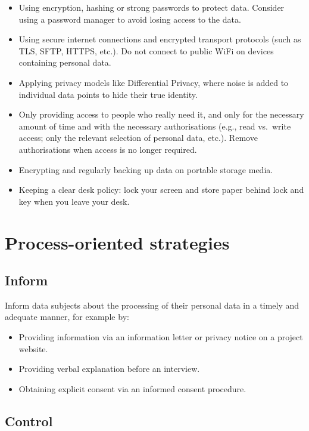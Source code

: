 \documentclass[
]{book}
\providecommand{\tightlist}{%
  \setlength{\itemsep}{0pt}\setlength{\parskip}{0pt}}
\begin{document}
\begin{itemize}
\tightlist
\item
  Using encryption, hashing or
  strong passwords
  to protect data. Consider using a password manager to avoid losing access to the
  data.
\item
  Using secure internet connections and encrypted transport protocols (such as
  TLS, SFTP, HTTPS, etc.). Do not connect to public WiFi on devices containing
  personal data.
\item
  Applying privacy models like Differential Privacy,
  where noise is added to individual data points to hide their true identity.
\item
  Only providing access to people who really need it, and only for the necessary
  amount of time and with the necessary authorisations (e.g., read vs.~write
  access; only the relevant selection of personal data, etc.). Remove
  authorisations when access is no longer required.
\item
  Encrypting and regularly backing up data on portable storage media.
\item
  Keeping a clear desk policy: lock your screen and store paper behind lock and
  key when you leave your desk.
\end{itemize}

\hypertarget{process-oriented-strategies}{%
\section{Process-oriented strategies}\label{process-oriented-strategies}}

\hypertarget{inform}{%
\subsection{Inform}\label{inform}}

Inform data subjects about the processing of their personal data in a timely
and adequate manner, for example by:

\begin{itemize}
\tightlist
\item
  Providing information via an
  information letter or privacy notice on a project
  website.
\item
  Providing verbal explanation before an interview.
\item
  Obtaining explicit consent via an informed consent procedure.
\end{itemize}

\hypertarget{control}{%
\subsection{Control}\label{control}}
\end{document}
